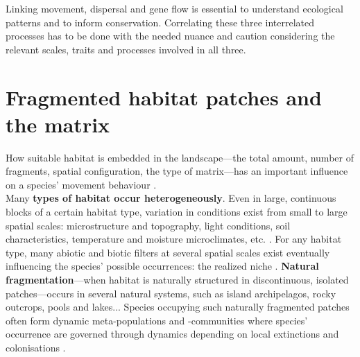 \documentclass[10pt, twoside]{book} %
\begin{document}
	Linking movement, dispersal and gene flow is essential to understand ecological patterns and to inform conservation. Correlating these three interrelated processes has to be done with the needed nuance and caution considering the relevant scales, traits and processes involved in all three.\\
	
	\section{Fragmented habitat patches and the matrix}
	How suitable habitat is embedded in the landscape---the total amount, number of fragments, spatial configuration, the type of matrix---has an important influence on a species' movement behaviour \citep{knowlton2010}.\\
	
	Many \textbf{types of habitat occur heterogeneously}. Even in large, continuous blocks of a certain habitat type, variation in conditions exist from small to large spatial scales: microstructure and topography, light conditions, soil characteristics, temperature and moisture microclimates, etc. \citep{gonzalez-megias2007, sercu2019}. For any habitat type, many abiotic and biotic filters at several spatial scales exist eventually influencing the species' possible occurrences: the realized niche \citep{pearman2008, colwell2009}. \textbf{Natural fragmentation}---when habitat is naturally structured in discontinuous, isolated patches---occurs in several natural systems, such as island archipelagos, rocky outcrops, pools and lakes... Species occupying such naturally fragmented patches often form dynamic meta-populations and -communities where species' occurrence are governed through dynamics depending on local extinctions and colonisations \citep{hanski1994, hanski1998}.\\
	
\end{document}
